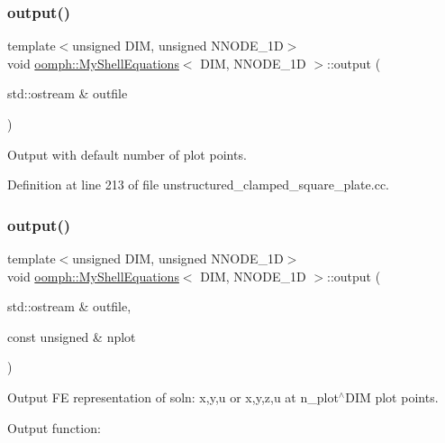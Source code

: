 \subsubsection{\texorpdfstring{output()}{output()}\hspace{0.1cm}{\footnotesize\ttfamily [1/4]}}
{\footnotesize\ttfamily template$<$unsigned D\+IM, unsigned N\+N\+O\+D\+E\+\_\+1D$>$ \\
void \hyperlink{classoomph_1_1MyShellEquations}{oomph\+::\+My\+Shell\+Equations}$<$ D\+IM, N\+N\+O\+D\+E\+\_\+1D $>$\+::output (\begin{DoxyParamCaption}\item[{std\+::ostream \&}]{outfile }\end{DoxyParamCaption})\hspace{0.3cm}{\ttfamily [inline]}}



Output with default number of plot points. 



Definition at line 213 of file unstructured\+\_\+clamped\+\_\+square\+\_\+plate.\+cc.

\mbox{\label{classoomph_1_1MyShellEquations_ad4ad93d1ef0640f5ded693e0bc46aeb6}} 
\subsubsection{\texorpdfstring{output()}{output()}\hspace{0.1cm}{\footnotesize\ttfamily [2/4]}}
{\footnotesize\ttfamily template$<$unsigned D\+IM, unsigned N\+N\+O\+D\+E\+\_\+1D$>$ \\
void \hyperlink{classoomph_1_1MyShellEquations}{oomph\+::\+My\+Shell\+Equations}$<$ D\+IM, N\+N\+O\+D\+E\+\_\+1D $>$\+::output (\begin{DoxyParamCaption}\item[{std\+::ostream \&}]{outfile,  }\item[{const unsigned \&}]{nplot }\end{DoxyParamCaption})}



Output FE representation of soln\+: x,y,u or x,y,z,u at n\+\_\+plot$^\wedge$\+D\+IM plot points. 

Output function\+:

